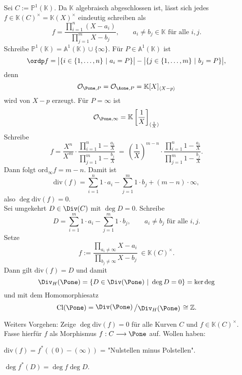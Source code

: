 \documentclass[11pt]{book}
\theoremstyle{nonumberbreak}
\newenvironment{ex}[1][]{\ifthenelse{\equal{#1}{}}{\example}{\example[#1]}\rm}{\endexample}
\newenvironment{bemdefin}[1][]{\ifthenelse{\equal{#1}{}}{\bemdefini}{\bemdefini[#1]}\rm}{\endbemdefini}
\newcommand{\slant}[2]{{\raisebox{.1em}{$#1$}\left/\raisebox{-.1em}{$#2$}\right.}}
\begin{document}
\begin{spacing}{1.3}
\begin{ex} Sei $C:= \mathbb{P}^1(\mathbb{K})$. Da $\mathbb{K}$ algebraisch abgeschlossen ist, lässt sich jedes $f \in \mathbb{K}(C)^{\times} = \mathbb{K}(X)^{\times}$ eindeutig schreiben als
$$f = \frac{ \prod_{i=1}^n (X-a_i)}{\prod_{j=1}^m X-b_j}, \qquad a_i \neq b_j \in \mathbb{K} \textrm{ für alle } i,j.$$
Schreibe $\mathbb{P}^1(\mathbb{K}) = \mathbb{A}^1 (\mathbb{K}) \cup \{ \infty \}$. Für $P \in \mathbb{A}^1(\mathbb{K})$ ist
$$\ordp f = \big\vert \{ i\in \{1, \ldots, n \} \ \vert \ a_i =P \} \big\vert - \big\vert \{ j\in \{1, \ldots, m \} \ \vert \ b_j = P \} \big\vert, $$
denn 
$$\mathcal{O}_{\Pone, P} = \mathcal{O}_{\Aone, P}  = \mathbb{K}[X]_{\langle X-p \rangle}$$
wird von $X-p$ erzeugt. Für $P= \infty$ ist 
$$\mathcal{O}_{\Pone, \infty} = \mathbb{K}\left[\frac{1}{X}\right]_{\langle \frac{1}{X} \rangle}$$
Schreibe 
$$f = \frac{X^n}{X^m} \cdot \frac{ \prod_{i=1}^n 1- \frac{a_i}{X}}{\prod_{j=1}^m 1- \frac{b_j}{X}}\ =\ \left( \frac{1}{X}\right)^{m-n} \cdot \frac{\prod_{i=1}^n 1- \frac{a_i}{X}}{\prod_{j=1}^m 1- \frac{b_j}{X}}.$$
Dann folgt
$\textrm{ord}_{\infty} f = m-n.$
Damit ist 
$$\textrm{div}(f) = \sum_{i=1}^n 1 \cdot a_i - \sum_{j=1}^m 1 \cdot b_j + (m-n) \cdot \infty, $$
also $\deg \textrm{div} (f) = 0$.\\
Sei umgekehrt $D \in \Div (C)$ mit $\deg D =0$. Schreibe
$$D= \sum_{i=1}^m 1 \cdot a_i - \sum_{j=1}^m 1 \cdot b_j, \qquad a_i \neq b_j \textrm{ für alle } i,j.$$
Setze
$$f:= \frac{\prod_{a_i \neq \infty} X - a_i }{\prod_{b_j \neq \infty} X- b_j} \ \in \mathbb{K}(C)^{\times}.$$
Dann gilt $\textrm{div}(f) = D$ und damit
$$\Div _H( \Pone) = \{ D \in \Div (\Pone) \ \vert \ \deg D=0 \} = \ker \deg$$
und mit dem Homomorphiesatz
$$\textrm{Cl}(\Pone) = \slant{\Div(\Pone)}{\Div _H ( \Pone)} \cong \mathbb{Z}.$$
\end{ex}

Weiters Vorgehen: Zeige $\deg \textrm{div}(f) =0$ für alle Kurven $C$ und $f \in \mathbb{K}(C)^{\times}$. Fasse hierfür $f$ als Morphismus $f: C \longrightarrow \Pone$ auf. Wollen haben:
\begin{compactenum}
\item $\textrm{div}(f) = f^{*} \left( (0) - (\infty)\right)$ = "Nulstellen minus Polstellen".
\item $\deg f^{*}(D) = \deg f \deg D$.	
\end{compactenum}

\begin{bemdefin} %


\end{bemdefin}
\end{spacing}
\end{document}
